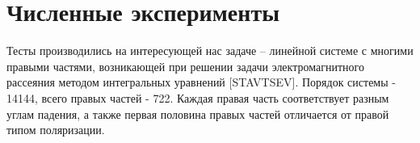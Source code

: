 \section{Численные эксперименты}
\label{sec:Chapter4} 

\par Тесты производились на интересующей нас задаче – линейной системе с многими 
правыми частями, возникающей при решении задачи электромагнитного рассеяния 
методом интегральных уравнений [STAVTSEV]. Порядок системы - 14144, всего правых частей - 722.
Каждая правая часть соответствует разным углам падения, а также первая половина правых частей отличается от правой типом поляризации. 
